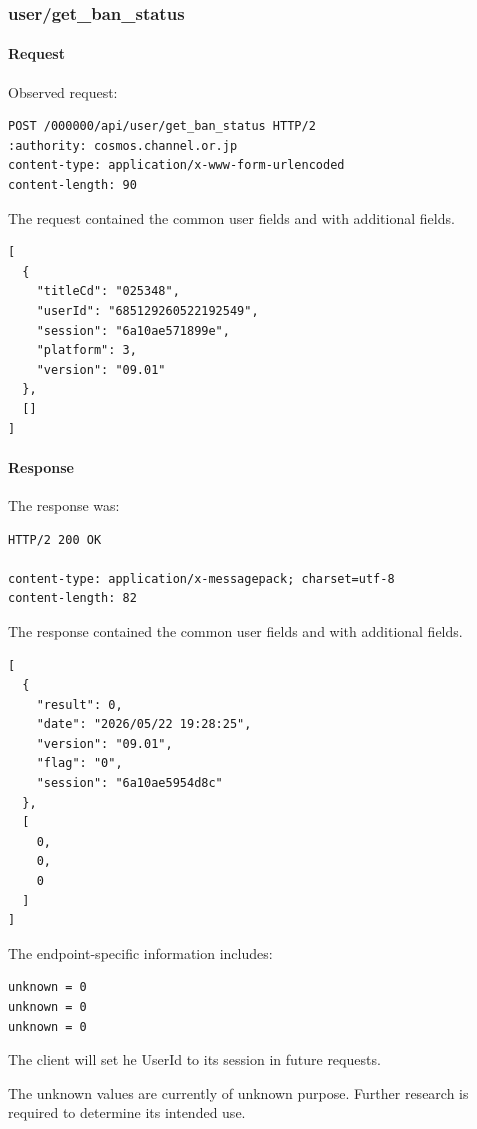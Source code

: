 \subsubsection{user/get\_ban\_status}
\label{subsec:api_user_get_ban_status}

\paragraph{Request}

Observed request:

\begin{lstlisting}
POST /000000/api/user/get_ban_status HTTP/2
:authority: cosmos.channel.or.jp
content-type: application/x-www-form-urlencoded
content-length: 90
\end{lstlisting}

The request contained the common user fields and with additional fields.

\begin{lstlisting}
[
  {
    "titleCd": "025348",
    "userId": "685129260522192549",
    "session": "6a10ae571899e",
    "platform": 3,
    "version": "09.01"
  },
  []
]
\end{lstlisting}

\newpage

\paragraph{Response}

The response was:

\begin{lstlisting}
HTTP/2 200 OK

content-type: application/x-messagepack; charset=utf-8
content-length: 82
\end{lstlisting}

The response contained the common user fields and with additional fields.

\begin{lstlisting}
[
  {
    "result": 0,
    "date": "2026/05/22 19:28:25",
    "version": "09.01",
    "flag": "0",
    "session": "6a10ae5954d8c"
  },
  [
    0,
    0,
    0
  ]
]
\end{lstlisting}

The endpoint-specific information includes:

\begin{lstlisting}
unknown = 0
unknown = 0
unknown = 0
\end{lstlisting}

The client will set he UserId to its session in future requests.

\begin{tcolorbox}[colback=yellow!10,colframe=orange!80!black,title=Warning]
The unknown values are currently of unknown purpose.
Further research is required to determine its intended use.
\end{tcolorbox}

\newpage